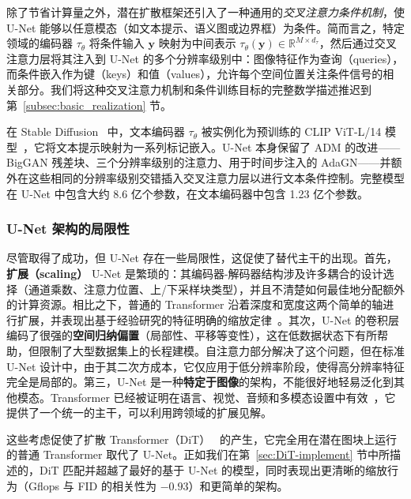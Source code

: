 \documentclass[../../book-main_zh.tex]{subfiles}
\begin{document}
除了节省计算量之外，潜在扩散框架还引入了一种通用的\emph{交叉注意力条件机制}，使 U-Net 能够以任意模态（如文本提示、语义图或边界框）为条件。简而言之，特定领域的编码器 $\tau_\theta$ 将条件输入 $\boldsymbol{y}$ 映射为中间表示 $\tau_\theta(\boldsymbol{y}) \in \mathbb{R}^{M \times d_\tau}$，然后通过交叉注意力层将其注入到 U-Net 的多个分辨率级别中：图像特征作为查询（queries），而条件嵌入作为键（keys）和值（values），允许每个空间位置关注条件信号的相关部分。我们将这种交叉注意力机制和条件训练目标的完整数学描述推迟到第~\ref{subsec:basic_realization} 节。

在 Stable Diffusion~\citep{rombach2022high} 中，文本编码器 $\tau_\theta$ 被实例化为预训练的 CLIP ViT-L/14 模型~\citep{radford2021learning}，它将文本提示映射为一系列标记嵌入。U-Net 本身保留了 ADM 的改进——BigGAN 残差块、三个分辨率级别的注意力、用于时间步注入的 AdaGN——并额外在这些相同的分辨率级别交错插入交叉注意力层以进行文本条件控制。完整模型在 U-Net 中包含大约 8.6 亿个参数，在文本编码器中包含 1.23 亿个参数。

\subsubsection{U-Net 架构的局限性}
\label{sec:unet-limitations}

尽管取得了成功，但 U-Net 存在一些局限性，这促使了替代主干的出现。首先，\textbf{扩展（scaling）} U-Net 是繁琐的：其编码器-解码器结构涉及许多耦合的设计选择（通道乘数、注意力位置、上/下采样块类型），并且不清楚如何最佳地分配额外的计算资源。相比之下，普通的 Transformer 沿着深度和宽度这两个简单的轴进行扩展，并表现出基于经验研究的特征明确的缩放定律~\citep{kaplan2020scaling}。其次，U-Net 的卷积层编码了很强的\textbf{空间归纳偏置}（局部性、平移等变性），这在低数据状态下有所帮助，但限制了大型数据集上的长程建模。自注意力部分解决了这个问题，但在标准 U-Net 设计中，由于其二次方成本，它仅应用于低分辨率阶段，使得高分辨率特征完全是局部的。第三，U-Net 是一种\textbf{特定于图像}的架构，不能很好地轻易泛化到其他模态。Transformer 已经被证明在语言、视觉、音频和多模态设置中有效~\citep{vaswani2017attention}，它提供了一个统一的主干，可以利用跨领域的扩展见解。

这些考虑促使了扩散 Transformer（DiT）~\citep{peebles2023scalable} 的产生，它完全用在潜在图块上运行的普通 Transformer 取代了 U-Net。正如我们在第~\ref{sec:DiT-implement} 节中所描述的，DiT 匹配并超越了最好的基于 U-Net 的模型，同时表现出更清晰的缩放行为（Gflops 与 FID 的相关性为 $-0.93$）和更简单的架构。
\end{document}

